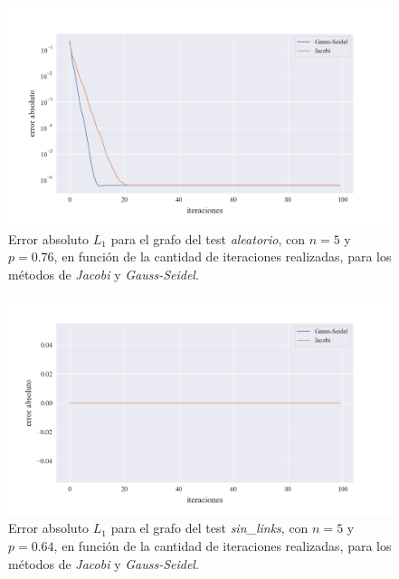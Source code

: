 \begin{figure}[!htbp]
    \centering
    \includegraphics[width=1\textwidth]{files/src/.media/convergencia_test_aleatorio.png}
    \caption{Error absoluto $L_1$ para el grafo del test \textit{aleatorio}, con $n = 5$ y $p = 0.76$, en función de la cantidad de iteraciones realizadas, para los métodos de \textit{Jacobi} y \textit{Gauss-Seidel}.} \label{test_aleatorio}
\end{figure}

\begin{figure}[!htbp]
    \centering
    \includegraphics[width=1\textwidth]{files/src/.media/convergencia_test_sin_links.png}
    \caption{Error absoluto $L_1$ para el grafo del test \textit{sin\_links}, con $n = 5$ y $p = 0.64$, en función de la cantidad de iteraciones realizadas, para los métodos de \textit{Jacobi} y \textit{Gauss-Seidel}.} \label{test_sin_links}
\end{figure}
